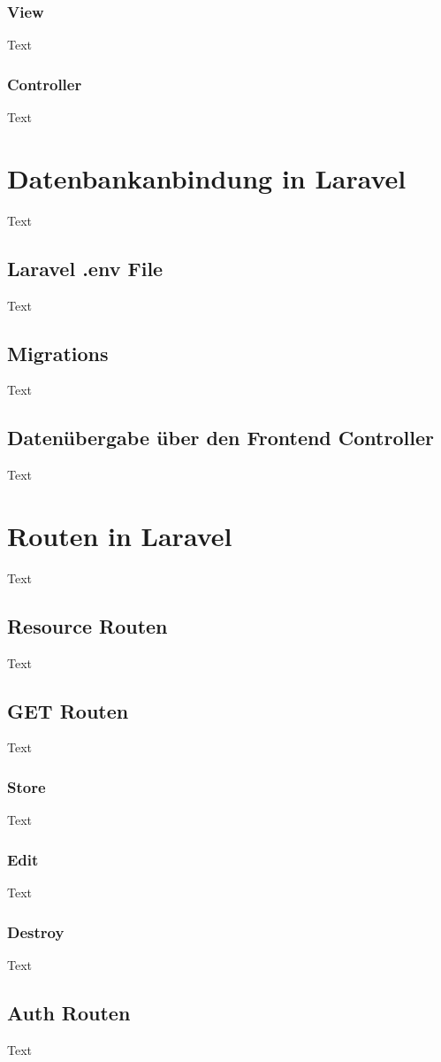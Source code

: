 \subsubsection{View}
Text
\subsubsection{Controller}
Text

\section{Datenbankanbindung in Laravel}
Text
\subsection{Laravel .env File}
Text
\subsection{Migrations}
Text
\subsection{Datenübergabe über den Frontend Controller}
Text

\section{Routen in Laravel}
Text
\subsection{Resource Routen}
Text
\subsection{GET Routen}
Text
\subsubsection{Store}
Text
\subsubsection{Edit}
Text
\subsubsection{Destroy}
Text

\subsection{Auth Routen}
Text

